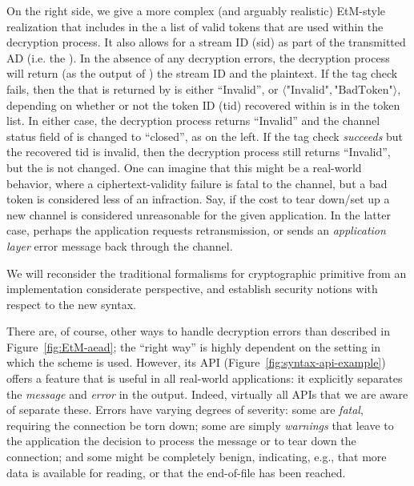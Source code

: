 On the right side, we give a more complex (and arguably realistic) EtM-style realization that includes
in the  a list of valid tokens that are used within
the decryption process. It also allows for a stream ID (sid) as part
of the transmitted AD (i.e. the ).  In the
absence of any decryption errors, the decryption process will return
(as the output of ) the stream ID and the
plaintext.  If the tag check fails, then the
 that is returned by  is either
``Invalid'', or $\langle\mbox{"Invalid"},\mbox{"BadToken"}\rangle$,
depending on whether or not the token ID (tid) recovered within
 is in the token list.  In either case, the
decryption process returns ``Invalid'' and the channel status field
of  is changed to ``closed'', as on the left.
If the tag check \emph{succeeds} but the recovered tid is invalid,
then the decryption process still returns ``Invalid'', but the
 is not changed.  One can imagine that this might be a real-world
  behavior, where a ciphertext-validity failure is fatal to the
  channel, but a bad token is considered less of an infraction. 
  Say, if the cost to tear down/set up a new
  channel is considered unreasonable for the given application. In the
  latter case, perhaps the application requests retransmission, or sends an
  \emph{application layer} error message back through the channel.




\begin{task}
{We will reconsider the traditional formalisms for cryptographic primitive from an implementation considerate perspective, and establish security notions with respect to the new syntax. }
\end{task}


There are, of course, other ways to handle decryption errors than described in
Figure~\ref{fig:EtM-aead}; the ``right way'' is highly dependent on the setting
in which the scheme is used. However, its API
(Figure~\ref{fig:syntax-api-example}) offers a feature that is useful in all
real-world applications: it explicitly separates the \emph{message} and
\emph{error} in the output.
%
Indeed, virtually all APIs that we are aware of separate these.  Errors have
varying degrees of severity: some are \emph{fatal}, requiring the connection be
torn down; some are simply \emph{warnings} that leave to the application the
decision to process the message or to tear down the connection; and some might
be completely benign, indicating, e.g., that more data is available for reading,
or that the end-of-file has been reached.

